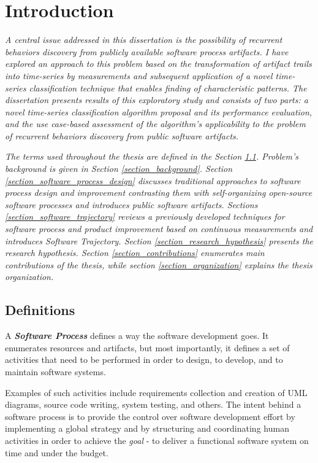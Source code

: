 \chapter{Introduction}\label{chapter_introduction}
\textit{A central issue addressed in this dissertation is the possibility of recurrent 
behaviors discovery from publicly available software process artifacts. 
I have explored an approach to this problem based on the transformation of artifact trails into 
time-series by measurements and subsequent application of a novel time-series classification 
technique that enables finding of characteristic patterns. 
The dissertation presents results of this exploratory study and consists of two parts: 
a novel time-series classification algorithm proposal and its performance evaluation, 
and the use case-based assessment of the algorithm's applicability to the problem of 
recurrent behaviors discovery from public software artifacts.}

\textit{The terms used throughout the thesis are defined in the Section \ref{section_terminology}. 
Problem's background is given in Section \ref{section_background}. 
Section \ref{section_software_process_design} discusses traditional approaches to software process 
design and improvement contrasting them with self-organizing open-source software processes 
and introduces public software artifacts.
Sections \ref{section_software_trajectory} reviews a previously developed techniques for software 
process and product improvement based on continuous measurements and introduces Software Trajectory.
Section \ref{section_research_hypothesis} presents the research hypothesis.
Section \ref{section_contributions} enumerates main contributions of the thesis, 
while section \ref{section_organization} explains the thesis organization.}

\section{Definitions}\label{section_terminology}
\begin{defn}\label{def_process}
A \textbf{\textit{Software Process}} defines a way the software development goes. It enumerates
resources and artifacts, but most importantly, it defines a set of activities that need to be 
performed in order to design, to develop, and to maintain software systems.
\end{defn}
Examples of such activities include requirements collection and creation of UML diagrams, 
source code writing, system testing, and others. The intent behind a software process is to provide 
the control over software development effort by implementing a global strategy and by structuring
and coordinating human activities in order to achieve the \textit{goal} - to deliver a functional
software system on time and under the budget. 

